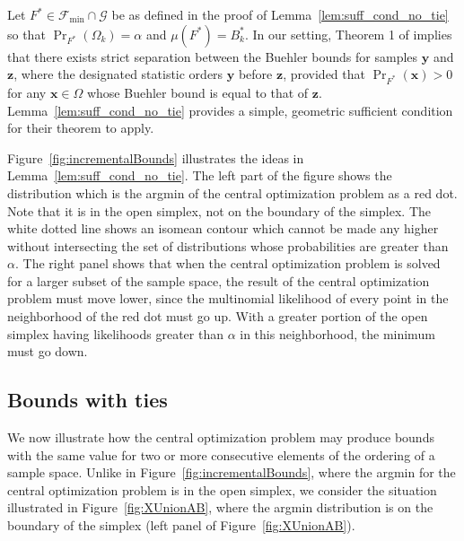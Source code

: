 \documentclass{article}
\theoremstyle{definition}
\theoremstyle{remark}
\newcommand{\z}{\mathbf{z}}
\newcommand{\y}{\mathbf{y}}
\def\y{\mathbf{y}}
\def\x{\mathbf{x}}
\begin{document}

Let $F^* \in \mathcal{F}_{\min} \cap \mathcal{G}$ be as defined in the proof of Lemma~\ref{lem:suff_cond_no_tie} so that $\Pr_{F^*}(\Omega_k) = \alpha$ and $\mu(F^*) = B^*_k$. %
In our setting, Theorem 1 of \cite{KabailaLloyd2006} implies that there exists strict separation between the Buehler bounds for samples $\y$ and $\z$, where the designated statistic orders $\y$ before $\z$, provided that $\Pr_{F^*}(\x) > 0$ for any $\x \in \Omega$ whose Buehler bound is equal to that of $\z$. Lemma~\ref{lem:suff_cond_no_tie} provides a simple, geometric sufficient condition for their theorem to apply.
\color{black}

Figure~\ref{fig:incrementalBounds} illustrates the ideas in Lemma~\ref{lem:suff_cond_no_tie}. The left part of the figure shows the distribution which is the argmin of the central optimization problem as a red dot. Note that it is in the open simplex, not on the boundary of the simplex. The white dotted line shows an isomean contour which cannot be made any higher without intersecting the set of distributions whose probabilities are greater than $\alpha$. The right panel shows that when the central optimization problem is solved for a larger subset of the sample space, the result of the central optimization problem must move lower, since the multinomial likelihood of every point in the neighborhood of the red dot must go up. With a greater portion of the open simplex having likelihoods greater than $\alpha$ in this neighborhood, the minimum must go down.

\subsection{Bounds with ties}
\label{sec:boundsWithTies}

We now illustrate how the central optimization problem may produce bounds with the same value for two or more consecutive elements of the ordering of a sample space. Unlike in Figure~\ref{fig:incrementalBounds}, where the argmin for the central optimization problem is in the open simplex, we consider the situation illustrated in Figure~\ref{fig:XUnionAB}, where the argmin distribution is on the boundary of the simplex (left panel of Figure~\ref{fig:XUnionAB}). 
\end{document}
